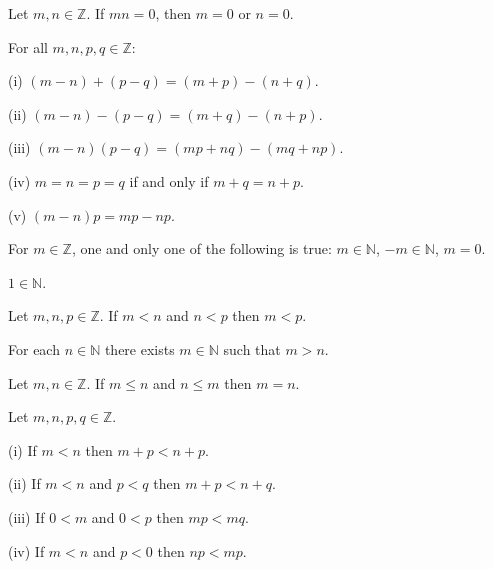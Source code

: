 \documentclass[12pt]{article}
\newenvironment{customprop}[1]{
  \renewcommand\theproposition{#1}
  \proposition
}{\endproposition}
\begin{document}
\begin{customprop}{1.26}
  Let $m, n \in \mathbb{Z}$. If $mn = 0$, then $m = 0$ or $n = 0$.
\end{customprop}

\begin{customprop}{1.27}
  For all $m, n, p, q \in \mathbb{Z}$:
  \item[(i)] $(m - n) + (p - q) = (m + p) - (n + q)$.
  \item[(ii)] $(m - n) - (p - q) = (m + q) - (n + p)$.
  \item[(iii)] $(m - n)(p - q) = (mp + nq) - (mq + np)$.
  \item[(iv)] $m = n = p = q$ if and only if $m + q = n + p$.
  \item[(v)] $(m - n)p = mp - np$.
\end{customprop}


\begin{customprop}{2.2}
  \item For \( m \in \mathbb{Z} \), one and only one of the following is true: \( m \in \mathbb{N} \), \( -m \in \mathbb{N} \), \( m = 0 \).
\end{customprop}

\begin{customprop}{2.3}
  \( 1 \in \mathbb{N} \).
\end{customprop}

\begin{customprop}{2.4}
  Let \( m, n, p \in \mathbb{Z} \). If \( m < n \) and \( n < p \) then \( m < p \).
\end{customprop}

\begin{customprop}{2.5}
  For each \( n \in \mathbb{N} \) there exists \( m \in \mathbb{N} \) such that \( m > n \).
\end{customprop}

\begin{customprop}{2.6}
  Let \( m, n \in \mathbb{Z} \). If \( m \leq n \) and \( n \leq m \) then \( m = n \).
\end{customprop}

\begin{customprop}{2.7}
  Let \( m, n, p, q \in \mathbb{Z} \).
  \item[(i)] If \( m < n \) then \( m + p < n + p \).
  \item[(ii)] If \( m < n \) and \( p < q \) then \( m + p < n + q \).
  \item[(iii)] If \( 0 < m \) and \( 0 < p \) then \( mp < mq \).
  \item[(iv)] If \( m < n \) and \( p < 0 \) then \( np < mp \).
\end{customprop}
\end{document}
